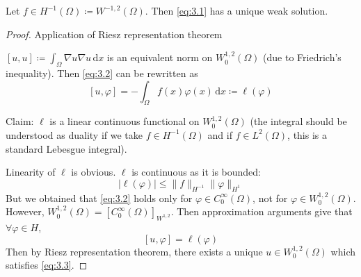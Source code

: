 \documentclass{report}
\begin{document}
\begin{theorem}{}{}
    Let \(f \in H^{-1}(\Omega) \coloneqq W^{-1, 2}(\Omega)\). Then \ref{eq:3.1} has a unique weak solution.
\end{theorem}

\begin{proof}{Application of Riesz representation theorem}

    \([u,u] \coloneqq \int_{\Omega} \nabla u \nabla u \,\mathrm{d}x\) is an equivalent norm on \(W^{1, 2}_{0}(\Omega)\) (due to Friedrich's inequality). Then \ref{eq:3.2} can be rewritten as
    \[
        [u, \varphi] = - \int_{\Omega} f(x)\varphi(x) \,\mathrm{d}x \coloneqq \ell(\varphi)
    \]

    Claim: \(\ell\) is a linear continuous functional on \(W^{1, 2}_{0}(\Omega)\) (the integral should be understood as duality if we take \(f \in H^{-1}(\Omega)\) and if \(f \in L^{2}(\Omega)\), this is a standard Lebesgue integral).

    Linearity of \(\ell\) is obvious. \(\ell\) is continuous as it is bounded:
    \[
        \vert \ell(\varphi) \vert \leq \|f\|_{H^{-1}} \| \varphi \|_{H^{1}}
    \]
    But we obtained that \ref{eq:3.2} holds only for \(\varphi \in C^{\infty}_{0}(\Omega)\), not for \(\varphi \in W^{1, 2}_{0}(\Omega)\). However, \(W^{1, 2}_{0}(\Omega) = [C^{\infty}_{0}(\Omega)]_{W^{1, 2}}\). Then approximation arguments give that \(\forall \varphi \in H\), 
    \begin{equation}\label{eq:3.3}
        [u, \varphi] = \ell(\varphi)
    \end{equation}
    Then by Riesz representation theorem, there exists a unique \(u \in W^{1, 2}_{0}(\Omega)\) which satisfies \ref{eq:3.3}.
\end{proof}
\end{document}
